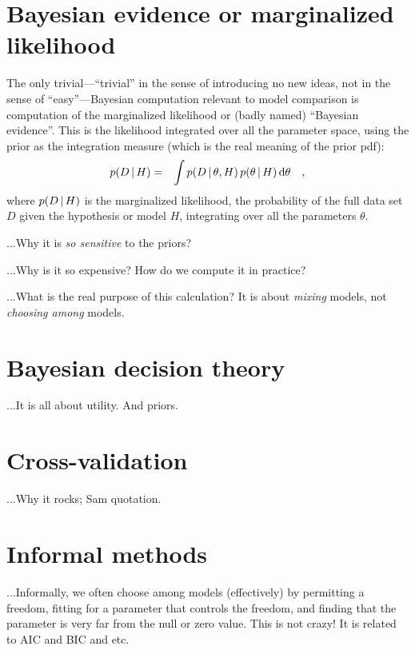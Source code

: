 \documentclass[12pt,twoside]{article}
\newcommand{\data}{D}
\newcommand{\pars}{\theta}
\begin{document}
\section{Bayesian evidence or marginalized likelihood}

The only trivial---``trivial'' in the sense of introducing no new
ideas, not in the sense of ``easy''---Bayesian computation
relevant to model comparison is computation of the marginalized
likelihood or (badly named) ``Bayesian evidence''.  This is the likelihood
integrated over all the parameter space, using the prior as the
integration measure (which is the real meaning of the prior
pdf):
\begin{eqnarray}
p(\data\given H) &=& \int p(\data\given\pars, H)\,p(\pars\given H)\,\dd\pars
\quad,
\end{eqnarray}
where $p(\data\given H)$ is the marginalized likelihood, the
probability of the full data set $\data$ given the hypothesis or model
$H$, integrating over all the parameters $\pars$.

...Why it is \emph{so sensitive} to the priors?

...Why is it so expensive?  How do we compute it in practice?

...What is the real purpose of this calculation?  It is about
\emph{mixing} models, not \emph{choosing among} models.

\section{Bayesian decision theory}

...It is all about utility.  And priors.

\section{Cross-validation}

...Why it rocks; Sam quotation.

\section{Informal methods} %

...Informally, we often choose among models (effectively) by
permitting a freedom, fitting for a parameter that controls the
freedom, and finding that the parameter is very far from the null or
zero value.  This is not crazy!  It is related to AIC and BIC and etc.
\end{document}
